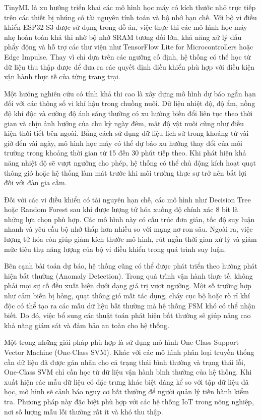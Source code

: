 TinyML là xu hướng triển khai các mô hình học máy có kích thước nhỏ trực tiếp trên các thiết bị nhúng có tài nguyên tính toán và bộ nhớ hạn chế. Với bộ vi điều khiển ESP32-S3 được sử dụng trong đồ án, việc thực thi các mô hình học máy nhẹ hoàn toàn khả thi nhờ bộ nhớ SRAM tương đối lớn, khả năng xử lý dấu phẩy động và hỗ trợ các thư viện như TensorFlow Lite for Microcontrollers hoặc Edge Impulse. Thay vì chỉ dựa trên các ngưỡng cố định, hệ thống có thể học từ dữ liệu thu thập được để đưa ra các quyết định điều khiển phù hợp với điều kiện vận hành thực tế của từng trang trại.

Một hướng nghiên cứu có tính khả thi cao là xây dựng mô hình dự báo ngắn hạn đối với các thông số vi khí hậu trong chuồng nuôi. Dữ liệu nhiệt độ, độ ẩm, nồng độ khí độc và cường độ ánh sáng thường có xu hướng biến đổi liên tục theo thời gian và chịu ảnh hưởng của chu kỳ ngày đêm, mật độ vật nuôi cũng như điều kiện thời tiết bên ngoài. Bằng cách sử dụng dữ liệu lịch sử trong khoảng từ vài giờ đến vài ngày, mô hình học máy có thể dự báo xu hướng thay đổi của môi trường trong khoảng thời gian từ 15 đến 30 phút tiếp theo. Khi phát hiện khả năng nhiệt độ sẽ vượt ngưỡng cho phép, hệ thống có thể chủ động kích hoạt quạt thông gió hoặc hệ thống làm mát trước khi môi trường thực sự trở nên bất lợi đối với đàn gia cầm.

Đối với các vi điều khiển có tài nguyên hạn chế, các mô hình như Decision Tree hoặc Random Forest sau khi được lượng tử hóa xuống độ chính xác 8 bit là những lựa chọn phù hợp. Các mô hình này có cấu trúc đơn giản, tốc độ suy luận nhanh và yêu cầu bộ nhớ thấp hơn nhiều so với mạng nơ-ron sâu. Ngoài ra, việc lượng tử hóa còn giúp giảm kích thước mô hình, rút ngắn thời gian xử lý và giảm mức tiêu thụ năng lượng của bộ vi điều khiển trong quá trình suy luận.

Bên cạnh bài toán dự báo, hệ thống cũng có thể được phát triển theo hướng phát hiện bất thường (Anomaly Detection). Trong quá trình vận hành thực tế, không phải mọi sự cố đều xuất hiện dưới dạng giá trị vượt ngưỡng. Một số trường hợp như cảm biến bị hỏng, quạt thông gió mất tác dụng, cháy cục bộ hoặc rò rỉ khí độc có thể tạo ra các mẫu dữ liệu bất thường mà hệ thống FSM khó có thể nhận biết. Do đó, việc bổ sung các thuật toán phát hiện bất thường sẽ giúp nâng cao khả năng giám sát và đảm bảo an toàn cho hệ thống.

Một trong những giải pháp phù hợp là sử dụng mô hình One-Class Support Vector Machine (One-Class SVM). Khác với các mô hình phân loại truyền thống cần dữ liệu đã được gán nhãn cho cả trạng thái bình thường và trạng thái lỗi, One-Class SVM chỉ cần học từ dữ liệu vận hành bình thường của hệ thống. Khi xuất hiện các mẫu dữ liệu có đặc trưng khác biệt đáng kể so với tập dữ liệu đã học, mô hình sẽ cảnh báo nguy cơ bất thường để người quản lý tiến hành kiểm tra. Phương pháp này đặc biệt phù hợp với các hệ thống IoT trong nông nghiệp, nơi số lượng mẫu lỗi thường rất ít và khó thu thập.

